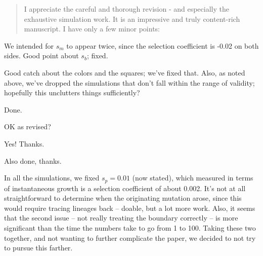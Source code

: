 \reviewersection

\begin{quote}
I appreciate the careful and thorough revision - and especially the exhaustive simulation work. It is an impressive and truly content-rich manuscript. I have only a few minor points:
\end{quote}


\reply
We intended for $s_m$ to appear twice, since the selection coefficient is -0.02 on both sides.  Good point about $s_b$; fixed.



\reply
Good catch about the colors and the squares; we've fixed that.
Also, as noted above, we've dropped the simulations that don't fall within the range of validity;
hopefully this unclutters things sufficiently?



\reply
Done.



\reply
OK as revised? \revref



\reply
Yes!  Thanks. \revref



\reply
Also done, thanks.



\reply
In all the simulations, we fixed $s_p=0.01$ (now stated),
which measured in terms of instantaneous growth is a selection coefficient of about 0.002.
It's not at all straightforward to determine when the originating mutation arose,
since this would require tracing lineages back -- doable, but a lot more work.
Also, it seems that the second issue -- not really treating the boundary correctly
-- is more significant than the time the numbers take to go from 1 to 100.
Taking these two together,
and not wanting to further complicate the paper,
we decided to not try to pursue this farther.

